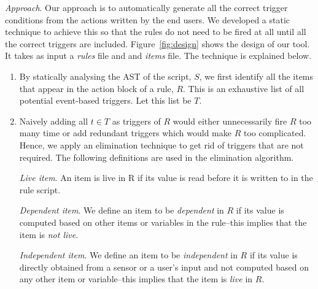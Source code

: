 \documentclass{sig-alternate-05-2015}
\begin{document}
\emph{Approach}. Our approach is to automatically generate all the correct trigger conditions from the actions written by the end users. We developed a static technique to achieve this so that the rules do not need to be fired at all until all the correct triggers are included. Figure~\ref{fig:design} shows the design of our tool. It takes as input a \textit{rules} file and and \textit{items} file. The technique is explained below.
\begin{enumerate}
\item By statically analysing the AST of the script, $S$, we first identify all the items that appear in the action block of a rule, $R$. This is an exhaustive list of all potential event-based triggers. Let this list be $T$.
\item Naively adding all $t \in T$ as triggers of $R$ would either unnecessarily fire $R$ too many time or add redundant triggers which would make $R$ too complicated. Hence, we apply an elimination technique to get rid of triggers that are not required. The following definitions are used in the elimination algorithm. 

\emph{Live item}. An item is live in R if its value is read before it is written to in the rule script. 

\emph{Dependent item}. We define an item to be \emph{dependent} in $R$ if its value is computed based on other items or variables in the rule--this implies that the item is \emph{not live}. 
 
\emph{Independent item}. We define an item to be \emph{independent} in $R$ if  its value is directly obtained from a sensor or a user's input and not computed based on any other item or variable--this implies that the item is \emph{live} in $R$. 


\end{enumerate}
\end{document}
